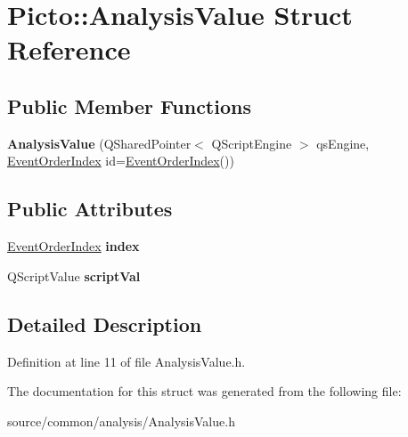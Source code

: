 \hypertarget{struct_picto_1_1_analysis_value}{\section{Picto\-:\-:Analysis\-Value Struct Reference}
\label{struct_picto_1_1_analysis_value}
}
\subsection*{Public Member Functions}
\begin{DoxyCompactItemize}
\item 
\hypertarget{struct_picto_1_1_analysis_value_acddd5d091ef3bae14976499593a98abb}{{\bfseries Analysis\-Value} (Q\-Shared\-Pointer$<$ Q\-Script\-Engine $>$ qs\-Engine, \hyperlink{class_picto_1_1_event_order_index}{Event\-Order\-Index} id=\hyperlink{class_picto_1_1_event_order_index}{Event\-Order\-Index}())}\label{struct_picto_1_1_analysis_value_acddd5d091ef3bae14976499593a98abb}

\end{DoxyCompactItemize}
\subsection*{Public Attributes}
\begin{DoxyCompactItemize}
\item 
\hypertarget{struct_picto_1_1_analysis_value_ac2b304cd387eff15c0a8dff6b0a1a43b}{\hyperlink{class_picto_1_1_event_order_index}{Event\-Order\-Index} {\bfseries index}}\label{struct_picto_1_1_analysis_value_ac2b304cd387eff15c0a8dff6b0a1a43b}

\item 
\hypertarget{struct_picto_1_1_analysis_value_a4fb129fee5029a4112144a37bba9c6f1}{Q\-Script\-Value {\bfseries script\-Val}}\label{struct_picto_1_1_analysis_value_a4fb129fee5029a4112144a37bba9c6f1}

\end{DoxyCompactItemize}


\subsection{Detailed Description}


Definition at line 11 of file Analysis\-Value.\-h.



The documentation for this struct was generated from the following file\-:\begin{DoxyCompactItemize}
\item 
source/common/analysis/Analysis\-Value.\-h\end{DoxyCompactItemize}
